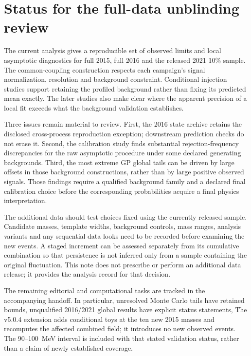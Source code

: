 \section{Status for the full-data unblinding review}
\label{sec:v5-review}

The current analysis gives a reproducible set of observed limits and local
asymptotic diagnostics for full 2015, full 2016 and the released 2021 10\%
sample. The common-coupling construction respects each campaign's signal
normalization, resolution and background constraint. Conditional injection
studies support retaining the profiled background rather than fixing its
predicted mean exactly. The later studies also make clear where the apparent
precision of a local fit exceeds what the background validation establishes.

Three issues remain material to review. First, the 2016 state archive retains
the disclosed cross-process reproduction exception; downstream prediction
checks do not erase it. Second, the calibration study finds substantial
rejection-frequency discrepancies for the raw asymptotic procedure under some
declared generating backgrounds. Third, the most extreme GP global tails can
be driven by large offsets in those background constructions, rather than by
large positive observed signals. Those findings require a qualified background
family and a declared final calibration choice before the corresponding
probabilities acquire a final physics interpretation.

The additional data should test choices fixed using the currently released
sample. Candidate masses, template widths, background controls, mass ranges,
analysis variants and any sequential data looks need to be recorded before
examining the new events. A staged increment can be assessed separately from
its cumulative combination so that persistence is not inferred only from a
sample containing the original fluctuation. This note does not prescribe or
perform an additional data release; it provides the analysis record for that
decision.

The remaining editorial and computational tasks are tracked in the accompanying
handoff. In particular, unresolved Monte Carlo tails have retained bounds,
unqualified 2016/2021 global results have explicit status statements, The v5.0.4 extension adds conditional toys at the ten new 2015 masses
and recomputes the affected combined field; it introduces no new observed
events. The 90--100~MeV interval is included with that stated validation
status, rather than a claim of newly established coverage.
